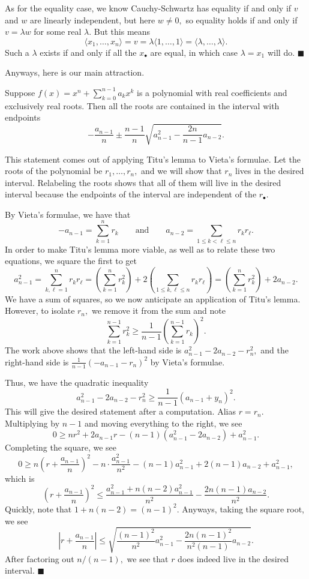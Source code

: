 As for the equality case, we know Cauchy-Schwartz has equality if and only if $v$ and $w$ are linearly independent, but here $w\ne0,$ so equality holds if and only if $v=\lambda w$ for some real $\lambda.$ But this means
\[\langle x_1,\ldots,x_n\rangle=v=\lambda\langle1,\ldots,1\rangle=\langle\lambda,\ldots,\lambda\rangle.\]
Such a $\lambda$ exists if and only if all the $x_\bullet$ are equal, in which case $\lambda=x_1$ will do. $\blacksquare$

Anyways, here is our main attraction.
\begin{theorem}
    Suppose $f(x)=x^n+\sum_{k=0}^{n-1}a_kx^k$ is a polynomial with real coefficients and exclusively real roots. Then all the roots are contained in the interval with endpoints
    \[-\frac{a_{n-1}}n\pm\frac{n-1}n\sqrt{a_{n-1}^2-\frac{2n}{n-1}a_{n-2}}.\]
\end{theorem}
This statement comes out of applying Titu's lemma to Vieta's formulae. Let the roots of the polynomial be $r_1,\ldots,r_n,$ and we will show that $r_n$ lives in the desired interval. Relabeling the roots shows that all of them will live in the desired interval because the endpoints of the interval are independent of the $r_\bullet.$

By Vieta's formulae, we have that
\[-a_{n-1}=\sum_{k=1}^nr_k\qquad\text{and}\qquad a_{n-2}=\sum_{1\le k<\ell\le n}r_kr_\ell.\]
In order to make Titu's lemma more viable, as well as to relate these two equations, we square the first to get
\[a_{n-1}^2=\sum_{k,\ell=1}^nr_kr_\ell=\left(\sum_{k=1}^nr_k^2\right)+2\left(\sum_{1\le k,\ell\le n}r_kr_\ell\right)=\left(\sum_{k=1}^nr_k^2\right)+2a_{n-2}.\]
We have a sum of squares, so we now anticipate an application of Titu's lemma. However, to isolate $r_n,$ we remove it from the sum and note
\[\sum_{k=1}^{n-1}r_k^2\ge\frac1{n-1}\left(\sum_{k=1}^{n-1}r_k\right)^2.\]
The work above shows that the left-hand side is $a_{n-1}^2-2a_{n-2}-r_n^2,$ and the right-hand side is $\frac1{n-1}(-a_{n-1}-r_n)^2$ by Vieta's formulae.

Thus, we have the quadratic inequality
\[a_{n-1}^2-2a_{n-2}-r_n^2\ge\frac1{n-1}(a_{n-1}+y_n)^2.\]
This will give the desired statement after a computation. Alias $r=r_n.$ Multiplying by $n-1$ and moving everything to the right, we see
\[0\ge nr^2+2a_{n-1}r-(n-1)\left(a_{n-1}^2-2a_{n-2}\right)+a_{n-1}^2.\]
Completing the square, we see
\[0\ge n\left(r+\frac{a_{n-1}}n\right)^2-n\cdot\frac{a_{n-1}^2}{n^2}-(n-1)a_{n-1}^2+2(n-1)a_{n-2}+a_{n-1}^2,\]
which is
\[\left(r+\frac{a_{n-1}}n\right)^2\le\frac{a_{n-1}^2+n(n-2)a_{n-1}^2}{n^2}-\frac{2n(n-1)a_{n-2}}{n^2}.\]
Quickly, note that $1+n(n-2)=(n-1)^2.$ Anyways, taking the square root, we see
\[\left|r+\frac{a_{n-1}}n\right|\le\sqrt{\frac{(n-1)^2}{n^2}a_{n-1}^2-\frac{2n(n-1)^2}{n^2(n-1)}a_{n-2}}.\]
After factoring out $n/(n-1),$ we see that $r$ does indeed live in the desired interval. $\blacksquare$

